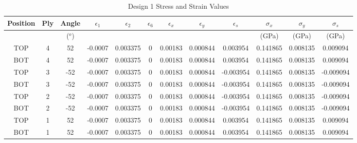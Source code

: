 


\begin{landscape}
\begin{table}
\centering
\caption{Design 1 Stress and Strain Values}
\label{tab:q1stress}
\begin{tabular}{|ccc|ccc|ccc|ccc|}
\toprule
Position &  Ply &  Angle & $\epsilon_{1}$ & $\epsilon_{2}$ & $\epsilon_{6}$ & $\epsilon_{x}$ & $\epsilon_{y}$ & $\epsilon_{s}$ & $\sigma_{x}$ & $\sigma_{y}$ & $\sigma_{s}$ \\
\midrule
 & & ($^{o}$) & & & & & & & (GPa) & (GPa) & (GPa) \\
\midrule
TOP &    4 &     52 & -0.0007 &  0.003375 &    0 &  0.00183 &  0.000844 &  0.003954 &       0.141865 &       0.008135 &       0.009094 \\
BOT &    4 &     52 & -0.0007 &  0.003375 &    0 &  0.00183 &  0.000844 &  0.003954 &       0.141865 &       0.008135 &       0.009094 \\
TOP &    3 &    -52 & -0.0007 &  0.003375 &    0 &  0.00183 &  0.000844 & -0.003954 &       0.141865 &       0.008135 &      -0.009094 \\
BOT &    3 &    -52 & -0.0007 &  0.003375 &    0 &  0.00183 &  0.000844 & -0.003954 &       0.141865 &       0.008135 &      -0.009094 \\
TOP &    2 &    -52 & -0.0007 &  0.003375 &    0 &  0.00183 &  0.000844 & -0.003954 &       0.141865 &       0.008135 &      -0.009094 \\
BOT &    2 &    -52 & -0.0007 &  0.003375 &    0 &  0.00183 &  0.000844 & -0.003954 &       0.141865 &       0.008135 &      -0.009094 \\
TOP &    1 &     52 & -0.0007 &  0.003375 &    0 &  0.00183 &  0.000844 &  0.003954 &       0.141865 &       0.008135 &       0.009094 \\
BOT &    1 &     52 & -0.0007 &  0.003375 &    0 &  0.00183 &  0.000844 &  0.003954 &       0.141865 &       0.008135 &       0.009094 \\
\bottomrule
\end{tabular}
\end{table}


\end{landscape}
